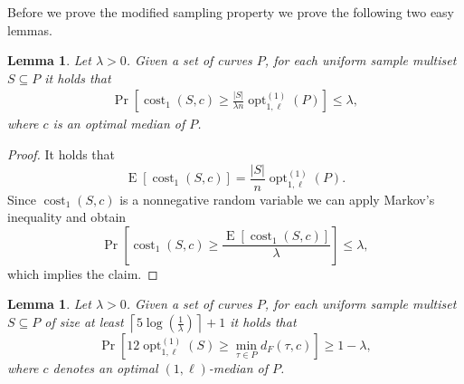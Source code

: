 \documentclass[11pt, letter]{article}
\DeclareMathOperator{\cost}{cost}
\DeclareMathOperator{\opt}{opt}
\DeclareMathOperator{\Exp}{E}
\newtheorem{lemma}[theorem]{Lemma}
\newcommand{\lemlab}[1]{\label{lemma:#1}}
\providecommand{\ceil}[1]{\left\lceil {#1} \right\rceil}
\providecommand{\pth}[2][\!]{#1\left({#2}\right)}
\newcommand{\pbrc}[1]{\left[ {#1} \right]}
\newcommand{\lenClusters}{\ensuremath{\ell}}
\newcommand{\distFr}[2]{\ensuremath{d_F\pth{#1,#2}}}
\begin{document}
Before we prove the modified sampling property we prove the following two easy
lemmas.


\begin{lemma}\lemlab{markov}
Let $\lambda > 0$. Given a set of curves $P$, for each uniform sample multiset
$S\subseteq P$ it holds that 
\begin{align*}
\Pr\left[\cost_1(S,c) \geq \frac{|S|}{\lambda n} \opt^{(1)}_{1,\lenClusters}(P)\right] \leq \lambda,
\end{align*}
where $c$ is an optimal median of $P$.
\end{lemma}

\begin{proof}
It holds that 
\[\Exp\pbrc{\cost_1(S,c)} =  \frac{|S|}{n} \opt^{(1)}_{1,\lenClusters}(P). \]
Since $\cost_1(S,c)$ is a nonnegative random variable we can apply Markov's inequality and obtain 
\[\Pr\left[\cost_1(S,c) \geq \frac{\Exp\pbrc{\cost_1(S,c)}}{\lambda} \right] \leq \lambda,\]
which implies the claim.
\end{proof}

\begin{lemma}\lemlab{diam:S}
Let $\lambda > 0$. Given a set of curves $P$, for each uniform sample multiset
$S\subseteq P$ of size at least $\ceil{5\log(\frac{1}{\lambda})}+1$ it holds that 
\[\Pr\pbrc{ 12 \opt_{1,\lenClusters}^{(1)}(S) \geq \min_{\tau \in P}
\distFr{\tau}{c} } \geq 1-\lambda, \]
where $c$ denotes an optimal $(1,\lenClusters)$-median of $P$.
\end{lemma}
\end{document}
